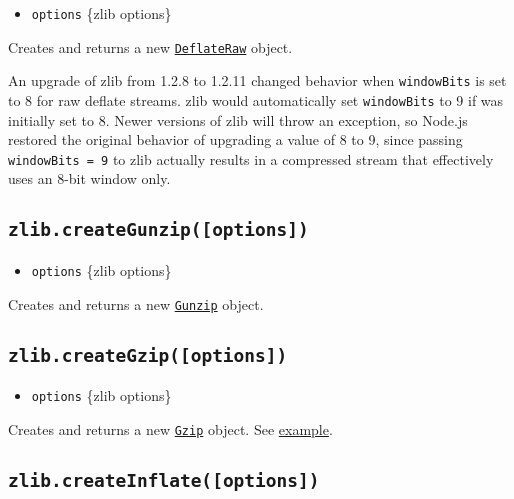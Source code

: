 \begin{itemize}
\tightlist
\item
  \texttt{options} \{zlib options\}
\end{itemize}

Creates and returns a new
\hyperref[class-zlibdeflateraw]{\texttt{DeflateRaw}} object.

An upgrade of zlib from 1.2.8 to 1.2.11 changed behavior when
\texttt{windowBits} is set to 8 for raw deflate streams. zlib would
automatically set \texttt{windowBits} to 9 if was initially set to 8.
Newer versions of zlib will throw an exception, so Node.js restored the
original behavior of upgrading a value of 8 to 9, since passing
\texttt{windowBits\ =\ 9} to zlib actually results in a compressed
stream that effectively uses an 8-bit window only.

\subsection{\texorpdfstring{\texttt{zlib.createGunzip({[}options{]})}}{zlib.createGunzip({[}options{]})}}\label{zlib.creategunzipoptions}

\begin{itemize}
\tightlist
\item
  \texttt{options} \{zlib options\}
\end{itemize}

Creates and returns a new \hyperref[class-zlibgunzip]{\texttt{Gunzip}}
object.

\subsection{\texorpdfstring{\texttt{zlib.createGzip({[}options{]})}}{zlib.createGzip({[}options{]})}}\label{zlib.creategzipoptions}

\begin{itemize}
\tightlist
\item
  \texttt{options} \{zlib options\}
\end{itemize}

Creates and returns a new \hyperref[class-zlibgzip]{\texttt{Gzip}}
object. See \hyperref[zlib]{example}.

\subsection{\texorpdfstring{\texttt{zlib.createInflate({[}options{]})}}{zlib.createInflate({[}options{]})}}\label{zlib.createinflateoptions}


